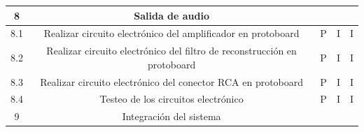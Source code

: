 \documentclass[11pt]{charter}
\begin{document}
\begin{table}[]
\begin{tabular}{|c|c|c|c|c|}
\rowcolor[HTML]{CBCEFB} 
8                                                                                              & Salida de audio                                                                    &                                                                             &                                                                    &                                                                      \\ \hline
8.1                                                                                            & Realizar circuito electrónico del amplificador en protoboard                       & P                                                                           & I                                                                  & I                                                                    \\ \hline
8.2                                                                                            & Realizar circuito electrónico del filtro de reconstrucción en protoboard           & P                                                                           & I                                                                  & I                                                                    \\ \hline
8.3                                                                                            & Realizar circuito electrónico del conector RCA en protoboard                       & P                                                                           & I                                                                  & I                                                                    \\ \hline
8.4                                                                                            & Testeo de los circuitos electrónico                                                & P                                                                           & I                                                                  & I                                                                    \\ \hline
\rowcolor[HTML]{CBCEFB} 
9                                                                                              & Integración del sistema                                                            &                                                                             &                                                                    &                                                                      \\ \hline

\end{tabular}
\end{table}
\end{document}
